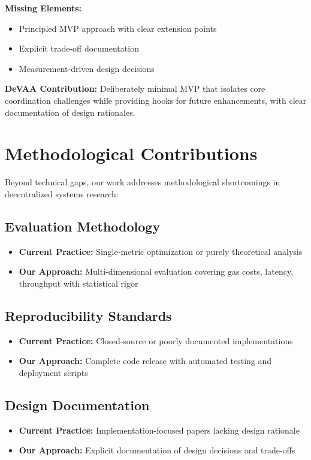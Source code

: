 \textbf{Missing Elements:}
\begin{itemize}
    \item Principled MVP approach with clear extension points
    \item Explicit trade-off documentation
    \item Measurement-driven design decisions
\end{itemize}

\textbf{DeVAA Contribution:} Deliberately minimal MVP that isolates core coordination challenges while providing hooks for future enhancements, with clear documentation of design rationales.

\section{Methodological Contributions}

Beyond technical gaps, our work addresses methodological shortcomings in decentralized systems research:

\subsection{Evaluation Methodology}
\begin{itemize}
    \item \textbf{Current Practice:} Single-metric optimization or purely theoretical analysis
    \item \textbf{Our Approach:} Multi-dimensional evaluation covering gas costs, latency, throughput with statistical rigor
\end{itemize}

\subsection{Reproducibility Standards}
\begin{itemize}
    \item \textbf{Current Practice:} Closed-source or poorly documented implementations
    \item \textbf{Our Approach:} Complete code release with automated testing and deployment scripts
\end{itemize}

\subsection{Design Documentation}
\begin{itemize}
    \item \textbf{Current Practice:} Implementation-focused papers lacking design rationale
    \item \textbf{Our Approach:} Explicit documentation of design decisions and trade-offs
\end{itemize}

